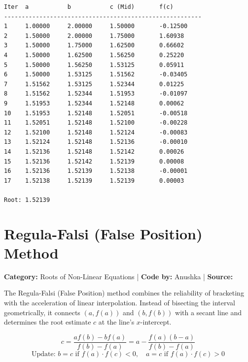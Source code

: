 \documentclass[10pt,a4paper]{report}
\begin{document}
\begin{tcolorbox}[colback=termbg,colframe=primary,title=\textbf{Program Execution Output \& Convergence Table},boxrule=1pt,arc=2mm]
\begin{lstlisting}[style=terminal_output]
Iter  a           b           c (Mid)       f(c)        
--------------------------------------------------------
1     1.00000     2.00000     1.50000       -0.12500    
2     1.50000     2.00000     1.75000       1.60938     
3     1.50000     1.75000     1.62500       0.66602     
4     1.50000     1.62500     1.56250       0.25220     
5     1.50000     1.56250     1.53125       0.05911     
6     1.50000     1.53125     1.51562       -0.03405    
7     1.51562     1.53125     1.52344       0.01225     
8     1.51562     1.52344     1.51953       -0.01097    
9     1.51953     1.52344     1.52148       0.00062     
10    1.51953     1.52148     1.52051       -0.00518    
11    1.52051     1.52148     1.52100       -0.00228    
12    1.52100     1.52148     1.52124       -0.00083    
13    1.52124     1.52148     1.52136       -0.00010    
14    1.52136     1.52148     1.52142       0.00026     
15    1.52136     1.52142     1.52139       0.00008     
16    1.52136     1.52139     1.52138       -0.00001    
17    1.52138     1.52139     1.52139       0.00003     

Root: 1.52139
\end{lstlisting}
\end{tcolorbox}

\newpage

\section{Regula-Falsi (False Position) Method}
\textbf{Category:} \textcolor{secondary}{Roots of Non-Linear Equations} \quad | \quad \textbf{Code by:} \textcolor{secondary}{Anushka} \quad | \quad \textbf{Source:} \texttt{}

The Regula-Falsi (False Position) method combines the reliability of bracketing with the acceleration of linear interpolation. Instead of bisecting the interval geometrically, it connects $(a, f(a))$ and $(b, f(b))$ with a secant line and determines the root estimate $c$ at the line's $x$-intercept.

\begin{tcolorbox}[colback=theorybg,colframe=theoryframe,title=\textbf{Mathematical Theory \& Formulation},boxrule=1pt,arc=2mm]
\[
c = \frac{a f(b) - b f(a)}{f(b) - f(a)} = a - \frac{f(a)(b - a)}{f(b) - f(a)}
\]
\[
\text{Update: } b = c \text{ if } f(a) \cdot f(c) < 0, \quad a = c \text{ if } f(a) \cdot f(c) > 0
\]
\end{tcolorbox}
\end{document}
